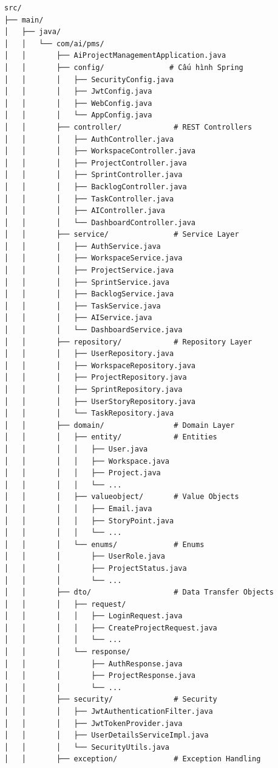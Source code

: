 \documentclass[12pt,a4paper]{report}
\begin{document}
\begin{verbatim}
src/
├── main/
│   ├── java/
│   │   └── com/ai/pms/
│   │       ├── AiProjectManagementApplication.java
│   │       ├── config/               # Cấu hình Spring
│   │       │   ├── SecurityConfig.java
│   │       │   ├── JwtConfig.java
│   │       │   ├── WebConfig.java
│   │       │   └── AppConfig.java
│   │       ├── controller/            # REST Controllers
│   │       │   ├── AuthController.java
│   │       │   ├── WorkspaceController.java
│   │       │   ├── ProjectController.java
│   │       │   ├── SprintController.java
│   │       │   ├── BacklogController.java
│   │       │   ├── TaskController.java
│   │       │   ├── AIController.java
│   │       │   └── DashboardController.java
│   │       ├── service/               # Service Layer
│   │       │   ├── AuthService.java
│   │       │   ├── WorkspaceService.java
│   │       │   ├── ProjectService.java
│   │       │   ├── SprintService.java
│   │       │   ├── BacklogService.java
│   │       │   ├── TaskService.java
│   │       │   ├── AIService.java
│   │       │   └── DashboardService.java
│   │       ├── repository/            # Repository Layer
│   │       │   ├── UserRepository.java
│   │       │   ├── WorkspaceRepository.java
│   │       │   ├── ProjectRepository.java
│   │       │   ├── SprintRepository.java
│   │       │   ├── UserStoryRepository.java
│   │       │   └── TaskRepository.java
│   │       ├── domain/                # Domain Layer
│   │       │   ├── entity/            # Entities
│   │       │   │   ├── User.java
│   │       │   │   ├── Workspace.java
│   │       │   │   ├── Project.java
│   │       │   │   └── ...
│   │       │   ├── valueobject/       # Value Objects
│   │       │   │   ├── Email.java
│   │       │   │   ├── StoryPoint.java
│   │       │   │   └── ...
│   │       │   └── enums/             # Enums
│   │       │       ├── UserRole.java
│   │       │       ├── ProjectStatus.java
│   │       │       └── ...
│   │       ├── dto/                   # Data Transfer Objects
│   │       │   ├── request/
│   │       │   │   ├── LoginRequest.java
│   │       │   │   ├── CreateProjectRequest.java
│   │       │   │   └── ...
│   │       │   └── response/
│   │       │       ├── AuthResponse.java
│   │       │       ├── ProjectResponse.java
│   │       │       └── ...
│   │       ├── security/              # Security
│   │       │   ├── JwtAuthenticationFilter.java
│   │       │   ├── JwtTokenProvider.java
│   │       │   ├── UserDetailsServiceImpl.java
│   │       │   └── SecurityUtils.java
│   │       ├── exception/             # Exception Handling

\end{verbatim}
\end{document}
